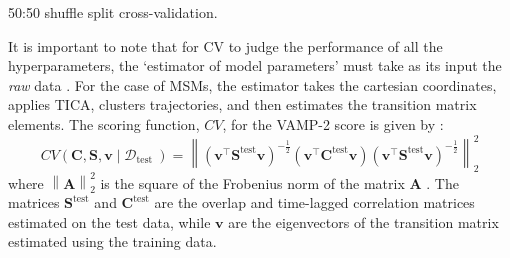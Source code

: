 \begin{algorithm}
\DontPrintSemicolon
{}

\BlankLine
{}
\caption{50:50 shuffle split cross-validation.\label{alg:shuffle_split}}
\end{algorithm}
It is important to note that for CV to judge the performance of all the hyperparameters, the `estimator of model parameters' must take as its input the \emph{raw} data \cite{friedman2001elements}. For the case of MSMs, the estimator takes the cartesian coordinates, applies TICA, clusters trajectories, and then estimates the transition matrix elements.  The scoring function, $CV$, for the VAMP-2 score is given by \cite{wuVariationalApproachLearning2020c}:
\begin{equation}
CV\left(\mathbf{C}, \mathbf{S}, \mathbf{v} \mid \mathcal{D}_{\text {test }}\right) 
=\left\|\left(\mathbf{v}^{\top} \mathbf{S}^{\text{test}} \mathbf{v}\right)^{-\frac{1}{2}}\left(\mathbf{v}^{\top} \mathbf{C}^{\text{test}} \mathbf{v}\right)\left(\mathbf{v}^{\top} \mathbf{S}^{\text{test}} \mathbf{v}\right)^{-\frac{1}{2}}\right\|_{2}^{2}
\end{equation}
where $\left\| \mathbf{A}\right\|_{2}^{2}$ is the square of the Frobenius norm of the matrix $\mathbf{A}$ \cite{wuVariationalApproachLearning2020c}. The matrices $\mathbf{S}^{\text{test}}$ and $\mathbf{C}^{\text{test}}$ are the overlap and time-lagged correlation matrices estimated on the test data, while $\mathbf{v}$ are the eigenvectors of the transition matrix estimated using the training data. 

